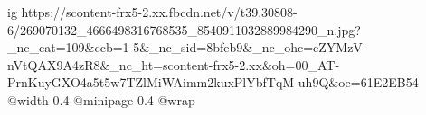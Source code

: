 
 
 
 
 

\ifcmt
  ig https://scontent-frx5-2.xx.fbcdn.net/v/t39.30808-6/269070132_4666498316768535_8540911032889984290_n.jpg?_nc_cat=109&ccb=1-5&_nc_sid=8bfeb9&_nc_ohc=cZYMzV-nVtQAX9A4zR8&_nc_ht=scontent-frx5-2.xx&oh=00_AT-PrnKuyGXO4a5t5w7TZlMiWAimm2kuxPlYbfTqM-uh9Q&oe=61E2EB54
  @width 0.4
  @minipage 0.4
  @wrap \parpic[r]
\fi
